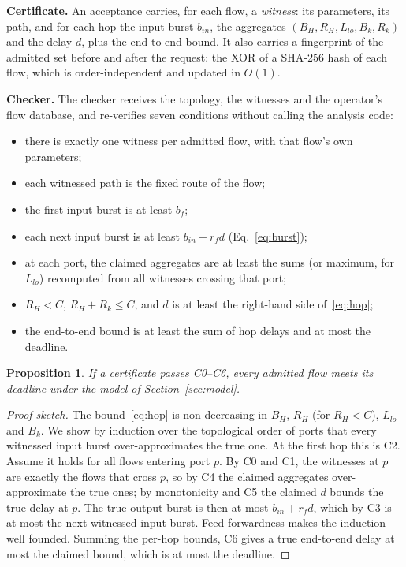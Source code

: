 \documentclass[conference]{IEEEtran}
\newtheorem{proposition}{Proposition}
\begin{document}
\textbf{Certificate.} An acceptance carries, for each flow, a \emph{witness}: its parameters, its path, and for each hop the input burst $b_{in}$, the aggregates $(B_H, R_H, L_{lo}, B_k, R_k)$ and the delay $d$, plus the end-to-end bound. It also carries a fingerprint of the admitted set before and after the request: the XOR of a SHA-256 hash of each flow, which is order-independent and updated in $O(1)$.

\textbf{Checker.} The checker receives the topology, the witnesses and the operator's flow database, and re-verifies seven conditions without calling the analysis code:
\begin{itemize}
\item[C0] there is exactly one witness per admitted flow, with that flow's own parameters;
\item[C1] each witnessed path is the fixed route of the flow;
\item[C2] the first input burst is at least $b_f$;
\item[C3] each next input burst is at least $b_{in} + r_f d$ (Eq.~\eqref{eq:burst});
\item[C4] at each port, the claimed aggregates are at least the sums (or maximum, for $L_{lo}$) recomputed from all witnesses crossing that port;
\item[C5] $R_H < C$, $R_H + R_k \le C$, and $d$ is at least the right-hand side of~\eqref{eq:hop};
\item[C6] the end-to-end bound is at least the sum of hop delays and at most the deadline.
\end{itemize}

\begin{proposition}
If a certificate passes C0--C6, every admitted flow meets its deadline under the model of Section~\ref{sec:model}.
\end{proposition}
\begin{proof}[Proof sketch]
The bound~\eqref{eq:hop} is non-decreasing in $B_H$, $R_H$ (for $R_H < C$), $L_{lo}$ and $B_k$. We show by induction over the topological order of ports that every witnessed input burst over-approximates the true one. At the first hop this is C2. Assume it holds for all flows entering port $p$. By C0 and C1, the witnesses at $p$ are exactly the flows that cross $p$, so by C4 the claimed aggregates over-approximate the true ones; by monotonicity and C5 the claimed $d$ bounds the true delay at $p$. The true output burst is then at most $b_{in} + r_f d$, which by C3 is at most the next witnessed input burst. Feed-forwardness makes the induction well founded. Summing the per-hop bounds, C6 gives a true end-to-end delay at most the claimed bound, which is at most the deadline.
\end{proof}
\end{document}
